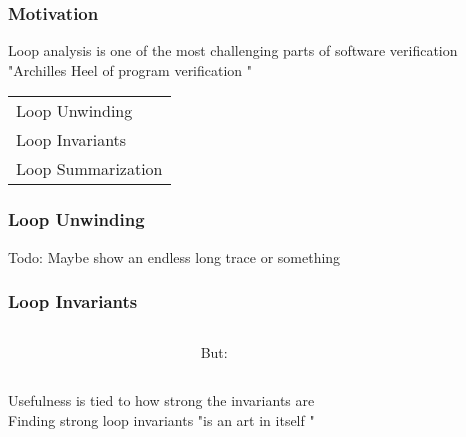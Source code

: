 \begin{frame}[t]
	\frametitle{Motivation}
	\begin{center}
		Loop analysis is one of the most challenging parts of software verification \\
		"\color{emblue}Archilles Heel of program verification \color{black}" \cite{DBLP:journals/fmsd/KroeningSTTW13} \pause
			\begin{minipage}{0.35\textwidth}
				\vspace*{0.5cm}
				\resizebox{0.7\textwidth}{!}{}
			\end{minipage}
		\pause
		\begin{tabular}{@{}l@{}}
			\tabitem Loop Unwinding \\
			\tabitem Loop Invariants \\
			\tabitem Loop Summarization
		\end{tabular}
	\end{center} 
\end{frame}

\begin{frame}[t]
	\frametitle{Loop Unwinding}
	Todo: Maybe show an endless long trace or something
\end{frame}
\begin{frame}[t]
	\frametitle{Loop Invariants}
	\begin{center}
		\begin{columns}[c]
		\begin{column}{0.35\textwidth}
			\begin{figure}[h]
				\vspace*{0.5cm}
				\resizebox{0.7\textwidth}{!}{}
			\end{figure}
		\end{column}
		\begin{column}{0.05\textwidth}
				But:
		\end{column}
		\begin{column}{0.35\textwidth}
			\begin{figure}[h]
				\vspace*{0.5cm}
				\resizebox{0.7\textwidth}{!}{}
			\end{figure}
		\end{column}
	\end{columns}
	Usefulness is tied to how strong the invariants are \\
	Finding strong loop invariants "\color{emblue}is an art in itself \color{black}" \cite{DBLP:journals/fmsd/KroeningSTTW13}
	\end{center}
\end{frame}

